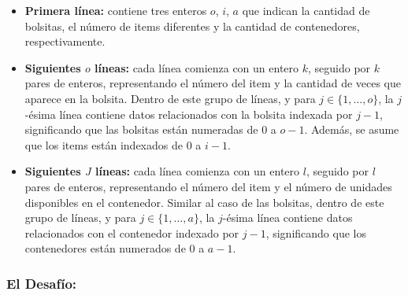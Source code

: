 \documentclass[a4paper,12pt]{article}
\begin{document}
\begin{itemize}
    \item \textbf{Primera línea:} contiene tres enteros $o$, $i$, $a$ que indican la cantidad de bolsitas, el número de items diferentes y la cantidad de contenedores, respectivamente.
    \item \textbf{Siguientes $o$ líneas:} cada línea comienza con un entero \(k\), seguido por \(k\) pares de enteros, representando el número del item y la cantidad de veces que aparece en la bolsita. Dentro de este grupo de líneas, y para \(j \in \{1, \ldots, o\}\), la \(j\)-ésima línea contiene datos relacionados con la bolsita indexada por \(j-1\), significando que las bolsitas están numeradas de \(0\) a \(o-1\). Además, se asume que los items están indexados de \(0\) a \(i-1\).
    \item \textbf{Siguientes $J$ líneas:} cada línea comienza con un entero \(l\), seguido por \(l\) pares de enteros, representando el número del item y el número de unidades disponibles en el contenedor. Similar al caso de las bolsitas, dentro de este grupo de líneas, y para \(j \in \{1, \ldots, a\}\), la \(j\)-ésima línea contiene datos relacionados con el contenedor indexado por \(j-1\), significando que los contenedores están numerados de \(0\) a \(a-1\).
\end{itemize}

\subsubsection*{El Desafío:}
\end{document}
